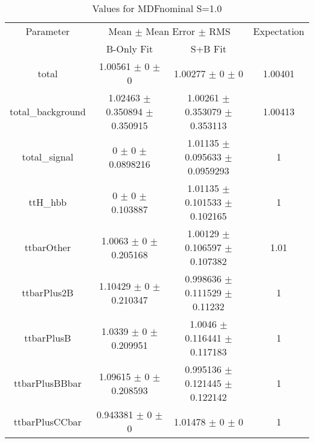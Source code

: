 \begin{table}
\centering
\caption{Values for MDFnominal S=1.0}
\begin{tabular}{cccc}
\toprule
Parameter & \multicolumn{2}{c}{Mean $\pm$ Mean Error $\pm$ RMS} & Expectation\\
 & B-Only Fit & S+B Fit & \\
\midrule
total & \num{1.00561} $\pm$ \num{0} $\pm$ \num{0} & \num{1.00277} $\pm$ \num{0} $\pm$ \num{0} & \num{1.00401}\\
total\_background & \num{1.02463} $\pm$ \num{0.350894} $\pm$ \num{0.350915} & \num{1.00261} $\pm$ \num{0.353079} $\pm$ \num{0.353113} & \num{1.00413}\\
total\_signal & \num{0} $\pm$ \num{0} $\pm$ \num{0.0898216} & \num{1.01135} $\pm$ \num{0.095633} $\pm$ \num{0.0959293} & \num{1}\\
ttH\_hbb & \num{0} $\pm$ \num{0} $\pm$ \num{0.103887} & \num{1.01135} $\pm$ \num{0.101533} $\pm$ \num{0.102165} & \num{1}\\
ttbarOther & \num{1.0063} $\pm$ \num{0} $\pm$ \num{0.205168} & \num{1.00129} $\pm$ \num{0.106597} $\pm$ \num{0.107382} & \num{1.01}\\
ttbarPlus2B & \num{1.10429} $\pm$ \num{0} $\pm$ \num{0.210347} & \num{0.998636} $\pm$ \num{0.111529} $\pm$ \num{0.11232} & \num{1}\\
ttbarPlusB & \num{1.0339} $\pm$ \num{0} $\pm$ \num{0.209951} & \num{1.0046} $\pm$ \num{0.116441} $\pm$ \num{0.117183} & \num{1}\\
ttbarPlusBBbar & \num{1.09615} $\pm$ \num{0} $\pm$ \num{0.208593} & \num{0.995136} $\pm$ \num{0.121445} $\pm$ \num{0.122142} & \num{1}\\
ttbarPlusCCbar & \num{0.943381} $\pm$ \num{0} $\pm$ \num{0} & \num{1.01478} $\pm$ \num{0} $\pm$ \num{0} & \num{1}\\
\bottomrule
\end{tabular}
\end{table}